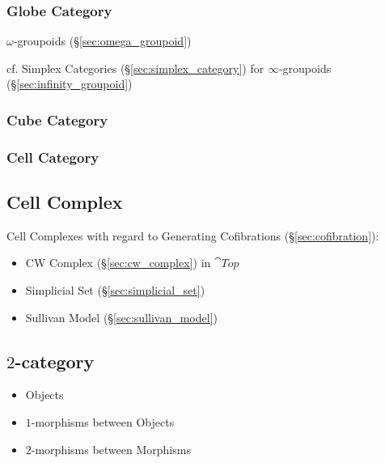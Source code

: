 \subsubsection{Globe Category}\label{sec:globe_category}


$\omega$-groupoids (\S\ref{sec:omega_groupoid})

\fist cf. Simplex Categories (\S\ref{sec:simplex_category}) for
$\infty$-groupoids (\S\ref{sec:infinity_groupoid})



\subsubsection{Cube Category}\label{sec:cube_category}

\subsubsection{Cell Category}\label{sec:cell_category}



\subsection{Cell Complex}\label{sec:cell_complex}

Cell Complexes with regard to Generating Cofibrations
(\S\ref{sec:cofibration}):
\begin{itemize}
\item CW Complex (\S\ref{sec:cw_complex}) in $\cat{Top}$
\item Simplicial Set (\S\ref{sec:simplicial_set})
\item Sullivan Model (\S\ref{sec:sullivan_model})
\end{itemize}



\subsection{$2$-category}\label{sec:2_category}

\begin{itemize}
  \item Objects
  \item $1$-morphisms between Objects
  \item $2$-morphisms between Morphisms
\end{itemize}


